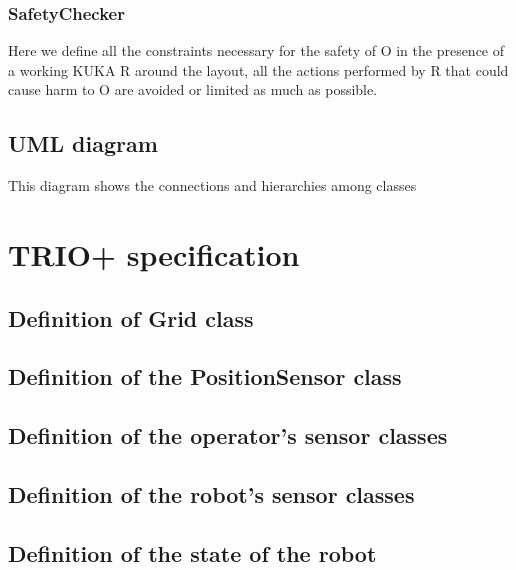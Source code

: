 \documentclass[a4paper]{article}
\begin{document}
\subsubsection{SafetyChecker}
Here we define all the constraints necessary for the safety of O in the presence of a working KUKA R around the layout, all the actions performed by R that could cause harm to O are avoided or limited as much as possible.

\subsection{UML diagram}
This diagram shows the connections and hierarchies among classes
\clearpage
\section{TRIO+ specification}

\subsection{Definition of Grid class}


\pagebreak
\subsection{Definition of the PositionSensor class}


\pagebreak
\subsection{Definition of the operator's sensor classes}


\pagebreak



\pagebreak
\subsection{Definition of the robot's sensor classes}


\pagebreak


\pagebreak
\subsection{Definition of the state of the robot}

\end{document}
